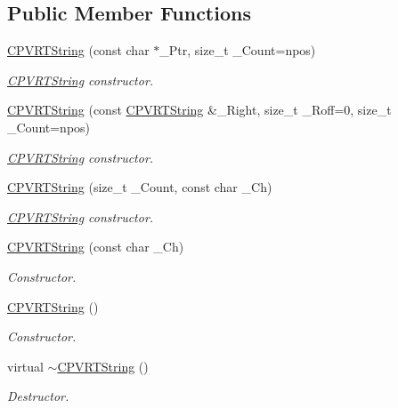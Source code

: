 \subsection*{Public Member Functions}
\begin{DoxyCompactItemize}
\item 
\hyperlink{class_c_p_v_r_t_string_aed75cf589c42185d69bd6cabd19435d3}{C\+P\+V\+R\+T\+String} (const char $\ast$\+\_\+\+Ptr, size\+\_\+t \+\_\+\+Count=npos)
\begin{DoxyCompactList}\small\item\em \hyperlink{class_c_p_v_r_t_string}{C\+P\+V\+R\+T\+String} constructor. \end{DoxyCompactList}\item 
\hyperlink{class_c_p_v_r_t_string_a1c890ef396db88561f0abc6499bc4be6}{C\+P\+V\+R\+T\+String} (const \hyperlink{class_c_p_v_r_t_string}{C\+P\+V\+R\+T\+String} \&\+\_\+\+Right, size\+\_\+t \+\_\+\+Roff=0, size\+\_\+t \+\_\+\+Count=npos)
\begin{DoxyCompactList}\small\item\em \hyperlink{class_c_p_v_r_t_string}{C\+P\+V\+R\+T\+String} constructor. \end{DoxyCompactList}\item 
\hyperlink{class_c_p_v_r_t_string_afaa45c16f7e51e192c5fd60909e069bf}{C\+P\+V\+R\+T\+String} (size\+\_\+t \+\_\+\+Count, const char \+\_\+\+Ch)
\begin{DoxyCompactList}\small\item\em \hyperlink{class_c_p_v_r_t_string}{C\+P\+V\+R\+T\+String} constructor. \end{DoxyCompactList}\item 
\hyperlink{class_c_p_v_r_t_string_aee988e45f0476231e8fec8d929e119c3}{C\+P\+V\+R\+T\+String} (const char \+\_\+\+Ch)
\begin{DoxyCompactList}\small\item\em Constructor. \end{DoxyCompactList}\item 
\hyperlink{class_c_p_v_r_t_string_a7872190568c8d2ff9f1624467142c956}{C\+P\+V\+R\+T\+String} ()
\begin{DoxyCompactList}\small\item\em Constructor. \end{DoxyCompactList}\item 
virtual \hyperlink{class_c_p_v_r_t_string_a8f1b944f3a690eb172e3e1ca99845235}{$\sim$\+C\+P\+V\+R\+T\+String} ()
\begin{DoxyCompactList}\small\item\em Destructor. \end{DoxyCompactList}\item 

\end{DoxyCompactItemize}
